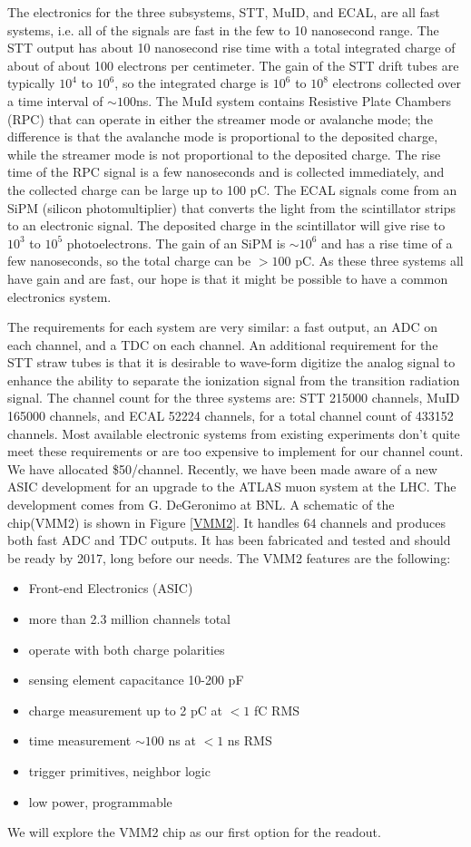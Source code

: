 The electronics for the three subsystems, STT, MuID, and ECAL, are all fast systems, 
i.e. all of the signals are fast in the few to 10 nanosecond range.  The STT output has 
about 10 nanosecond rise time with a total integrated charge of about of about 100 
electrons per centimeter.  The gain of the STT drift tubes are typically $10^4$ to $10^6$, 
so the integrated charge is  $10^6$ to $10^8$ electrons collected over a time interval of 
$\sim 100$ns.  The MuId system contains Resistive Plate Chambers (RPC) that can operate 
in either the streamer mode or avalanche mode; the difference is that the avalanche mode 
is proportional to the deposited charge, while the streamer mode is not proportional to 
the deposited charge.  The rise time of the RPC signal is a few nanoseconds and is 
collected immediately, and the collected charge can be large up to 100 pC.  The ECAL 
signals come from an SiPM (silicon photomultiplier) that converts the light from the 
scintillator strips to an electronic signal. The deposited charge in the scintillator 
will give rise to $10^3$ to $10^5$ photoelectrons.  The gain of an SiPM is $\sim 10^6$ and 
has a rise time of a few nanoseconds, so the total charge can be $> 100$ pC. As these 
three systems all have gain and are fast, our hope is that it might be possible to have a 
common electronics system.  

The requirements for each system are very similar: a fast output, an ADC on each channel, 
and a TDC on each channel.  An additional requirement for the STT straw tubes is that it 
is desirable to wave-form digitize the analog signal to enhance the ability to separate 
the ionization signal from the transition radiation signal.  The channel count for the 
three systems are: STT 215000 channels, MuID 165000 channels, and ECAL 52224 channels, 
for a total channel count  of 433152 channels.   Most available electronic systems from 
existing experiments don’t quite meet these requirements or are too expensive to implement 
for our channel count.  We have allocated \$50/channel.  Recently, we have been made aware 
of a new ASIC development for an upgrade to the ATLAS muon system at the LHC.  The 
development comes from G. DeGeronimo at BNL.  A schematic of the chip(VMM2) is shown in 
Figure \ref{VMM2}.  It handles 64 channels and produces both fast ADC and TDC outputs.
It has been fabricated and tested and should be ready by 2017, long before our needs.  
The VMM2 features are the following:
\begin{itemize}
\item Front-end Electronics (ASIC)
\item more than 2.3 million channels total
\item operate with both charge polarities
\item sensing element capacitance 10-200 pF
\item charge measurement up to 2 pC at $< 1$ fC RMS
\item time measurement $\sim 100$ ns at $< 1$ ns RMS
\item trigger primitives, neighbor logic
\item low power, programmable
\end{itemize}
We will explore the VMM2 chip as our first option for the readout.  


